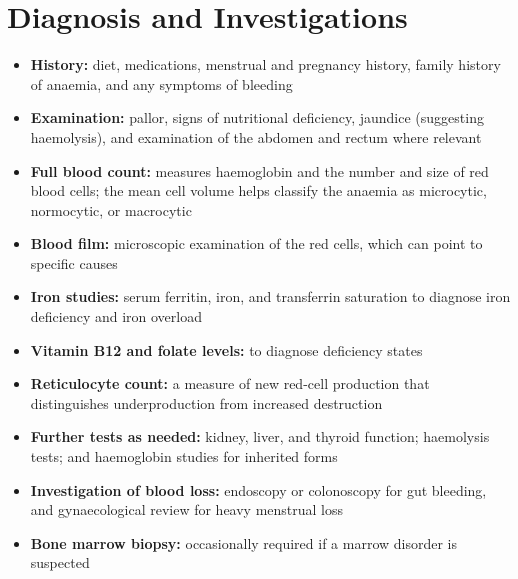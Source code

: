 \section*{Diagnosis and Investigations}
\begin{itemize}
    \item \textbf{History:} diet, medications, menstrual and pregnancy history, family history of anaemia, and any symptoms of bleeding
    \item \textbf{Examination:} pallor, signs of nutritional deficiency, jaundice (suggesting haemolysis), and examination of the abdomen and rectum where relevant
    \item \textbf{Full blood count:} measures haemoglobin and the number and size of red blood cells; the mean cell volume helps classify the anaemia as microcytic, normocytic, or macrocytic
    \item \textbf{Blood film:} microscopic examination of the red cells, which can point to specific causes
    \item \textbf{Iron studies:} serum ferritin, iron, and transferrin saturation to diagnose iron deficiency and iron overload
    \item \textbf{Vitamin B12 and folate levels:} to diagnose deficiency states
    \item \textbf{Reticulocyte count:} a measure of new red-cell production that distinguishes underproduction from increased destruction
    \item \textbf{Further tests as needed:} kidney, liver, and thyroid function; haemolysis tests; and haemoglobin studies for inherited forms
    \item \textbf{Investigation of blood loss:} endoscopy or colonoscopy for gut bleeding, and gynaecological review for heavy menstrual loss
    \item \textbf{Bone marrow biopsy:} occasionally required if a marrow disorder is suspected
\end{itemize}


